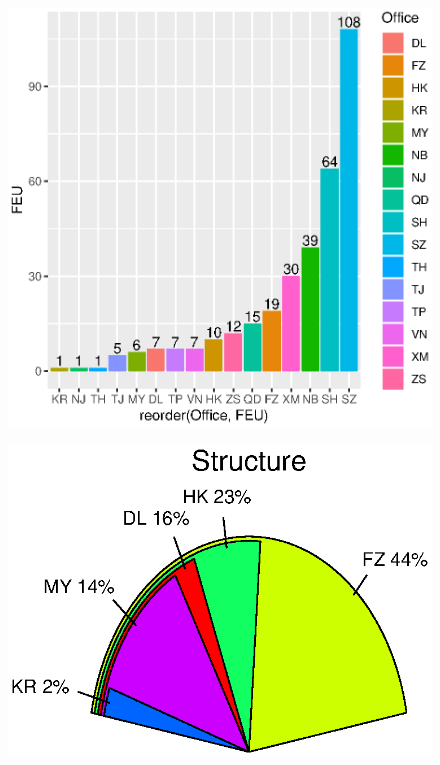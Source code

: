 \documentclass[a4paper]{article}
\begin{document}
		\begin{figure}
		\begin{center}
		\includegraphics{Rplot04}
		\end{center}
		\end{figure}
		\begin{figure}
		\begin{center}
		\includegraphics{Rplot09}
		\end{center}
		\end{figure}
\end{document}
